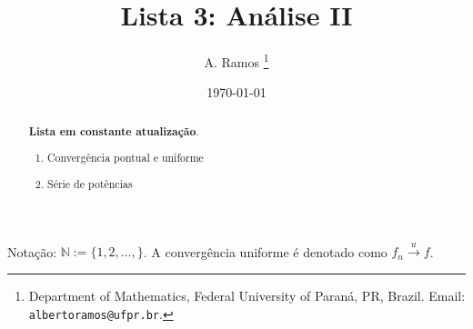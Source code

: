\documentclass{article}
\theoremstyle{plain}
\theoremstyle{definition}
\theoremstyle{remark}
\begin{document}
\title{Lista 3: Análise II}

\author{
A. Ramos \thanks{Department of Mathematics,
    Federal University of Paraná, PR, Brazil.
    Email: {\tt albertoramos@ufpr.br}.}
}

\date{\today}
 
\maketitle

\begin{abstract}
{\bf Lista em constante atualização}.
\begin{enumerate}
	\item Convergência pontual e uniforme
	\item Série de potências 
\end{enumerate}
\end{abstract}

Notação: $\mathbb{N}:=\{1,2,\dots,\}$. A convergência uniforme é denotado como $f_{n} \xrightarrow{u} f$.
\end{document}
